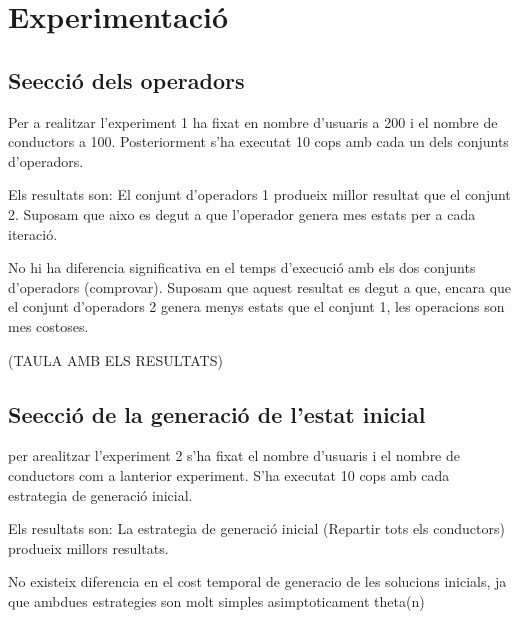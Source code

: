 \section{Experimentació}

\subsection{Se\lgem ecció dels operadors}
Per a realitzar l'experiment 1 ha fixat en nombre d'usuaris a 200 i el nombre de conductors a 100.
Posteriorment s'ha executat 10 cops amb cada un dels conjunts d'operadors.


Els resultats son:
        El conjunt d'operadors 1 produeix millor resultat que el conjunt 2.
        Suposam que aixo es degut a que l'operador genera mes estats per a cada iteració.

        No hi ha diferencia significativa en el temps d'execució amb els dos conjunts d'operadors (comprovar).
        Suposam que aquest resultat es degut a que, encara que el conjunt d'operadors 2 genera menys estats
        que el conjunt 1, les operacions son mes costoses.



        (TAULA AMB ELS RESULTATS)

\subsection{Se\lgem ecció de la generació de l'estat inicial}
per arealitzar l'experiment 2 s'ha fixat el nombre d'usuaris i el nombre de conductors com a lanterior experiment.                                                                                   
S'ha executat 10 cops amb cada estrategia de generació inicial.
                                                                                                                                                                                                     
Els resultats son:                                                                                                                                                                                   
        La estrategia de generació inicial (Repartir tots els conductors) produeix millors resultats.
                                                                                                                                                                                                     
        No existeix diferencia en el cost temporal de generacio de les solucions inicials, ja que                                                                                                    
        ambdues estrategies son molt simples asimptoticament theta(n)                                                                                                                                
                                                                                                                                                                                                     


